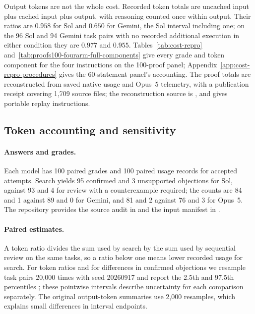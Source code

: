 Output tokens are not the whole cost. Recorded token totals are uncached input plus cached input plus output, with reasoning counted once within output. Their ratios are $0.958$ for Sol and $0.650$ for Gemini, the Sol interval including one; on the 96 Sol and 94 Gemini task pairs with no recorded additional execution in either condition they are $0.977$ and $0.955$. Tables~\ref{tab:cost-repro} and~\ref{tab:proofs100-fourarm-full-components} give every grade and token component for the four instructions on the 100-proof panel; Appendix~\ref{app:cost-repro-procedures} gives the 60-statement panel's accounting. The proof totals are reconstructed from saved native usage and Opus~5 telemetry, with a publication receipt covering 1,709 source files; the reconstruction source is , and  gives portable replay instructions.




\subsection{Token accounting and sensitivity}
\label{app:primary-witness-accounting}
\paragraph{Answers and grades.}
Each model has 100 paired grades and 100 paired usage records for accepted attempts. Search yields 95 confirmed and 3 unsupported objections for Sol, against 93 and 4 for review with a counterexample required; the counts are 84 and 1 against 89 and 0 for Gemini, and 81 and 2 against 76 and 3 for Opus~5. The repository provides the source audit in  and the input manifest in .

\paragraph{Paired estimates.}
A token ratio divides the sum used by search by the sum used by sequential review on the same tasks, so a ratio below one means lower recorded usage for search. For token ratios and for differences in confirmed objections we resample task pairs 20,000 times with seed 20260917 and report the 2.5th and 97.5th percentiles \citep{efron1979bootstrap}; these pointwise intervals describe uncertainty for each comparison separately. The original output-token summaries use 2,000 resamples, which explains small differences in interval endpoints.

